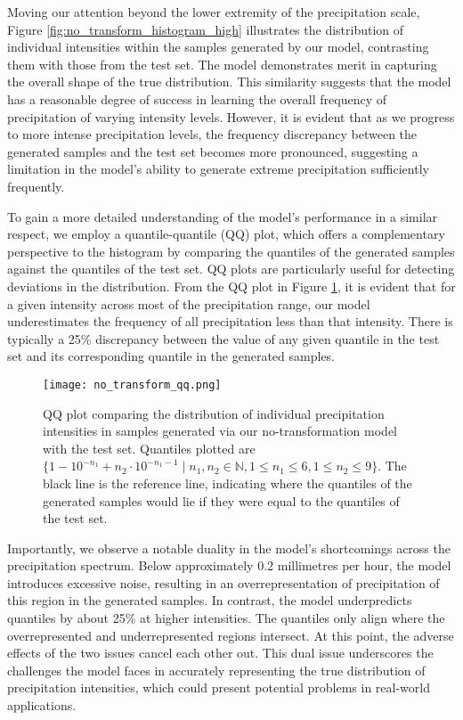 \documentclass[ oneside,%
                    author={George Herbert},
                    degree={MSci},
                     title={Diffusion Models for Time-Evolving Precipitation Fields},
                  subtitle={}]{dissertation}
\begin{document}
Moving our attention beyond the lower extremity of the precipitation scale, Figure \ref{fig:no_transform_histogram_high} illustrates the distribution of individual intensities within the samples generated by our model, contrasting them with those from the test set. The model demonstrates merit in capturing the overall shape of the true distribution. This similarity suggests that the model has a reasonable degree of success in learning the overall frequency of precipitation of varying intensity levels. However, it is evident that as we progress to more intense precipitation levels, the frequency discrepancy between the generated samples and the test set becomes more pronounced, suggesting a limitation in the model's ability to generate extreme precipitation sufficiently frequently.

To gain a more detailed understanding of the model's performance in a similar respect, we employ a quantile-quantile (QQ) plot, which offers a complementary perspective to the histogram by comparing the quantiles of the generated samples against the quantiles of the test set. QQ plots are particularly useful for detecting deviations in the distribution. From the QQ plot in Figure \ref{fig:no_transform_qq}, it is evident that for a given intensity across most of the precipitation range, our model underestimates the frequency of all precipitation less than that intensity. There is typically a 25\% discrepancy between the value of any given quantile in the test set and its corresponding quantile in the generated samples.

\begin{figure}[htbp]
      \centering
      \texttt{[image: no\_transform\_qq.png]}
      \caption{QQ plot comparing the distribution of individual precipitation intensities in samples generated via our no-transformation model with the test set. Quantiles plotted are $\{1 - 10^{-n_1} + n_2 \cdot 10^{-n_1 - 1}\mid n_1,n_2\in \mathbb{N}, 1 \le n_1 \le 6, 1 \le n_2 \le 9\}$. The black line is the reference line, indicating where the quantiles of the generated samples would lie if they were equal to the quantiles of the test set.}
      \label{fig:no_transform_qq}
\end{figure}

Importantly, we observe a notable duality in the model's shortcomings across the precipitation spectrum. Below approximately 0.2 millimetres per hour, the model introduces excessive noise, resulting in an overrepresentation of precipitation of this region in the generated samples. In contrast, the model underpredicts quantiles by about 25\% at higher intensities. The quantiles only align where the overrepresented and underrepresented regions intersect. At this point, the adverse effects of the two issues cancel each other out. This dual issue underscores the challenges the model faces in accurately representing the true distribution of precipitation intensities, which could present potential problems in real-world applications.
\end{document}
